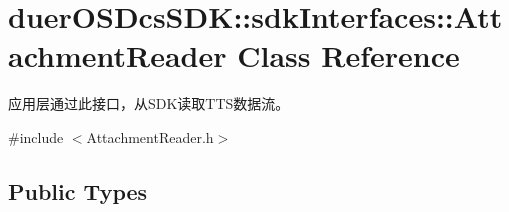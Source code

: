 \hypertarget{classduerOSDcsSDK_1_1sdkInterfaces_1_1AttachmentReader}{}\section{duer\+O\+S\+Dcs\+S\+DK\+:\+:sdk\+Interfaces\+:\+:Attachment\+Reader Class Reference}
\label{classduerOSDcsSDK_1_1sdkInterfaces_1_1AttachmentReader}


应用层通过此接口，从\+S\+D\+K读取\+T\+T\+S数据流。  




{\ttfamily \#include $<$Attachment\+Reader.\+h$>$}

\subsection*{Public Types}
